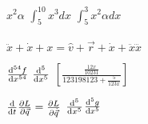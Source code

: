 \documentclass[11pt]{article}
\begin{document}
\(x^2 \alpha\)    
\(\int_5^{10} x^3 dx\)
\(\int_5^{3}x^2 \alpha dx\)
    \\
    \\
    \(\ddot{x} + \dot{x} + x = \hat{v} + \overrightarrow{r} + \dot{x} + \ddot{x} \dddot{x}\)

    \(\dv[54]{f}{x}\)
    \(\dv[5]{x}\)
    \(\left[ \frac{\frac{12x}{10231}}{123198123 + \frac{5}{123x}}\right]\)    

   \( \dv{t}\pdv{L}{ \vec{q} } = \pdv{L}{ \dot{\vec{q}}} \)
   \(\dv[5]{ x}\)\(\dv[5]{ g}{x}\)
\end{document}
